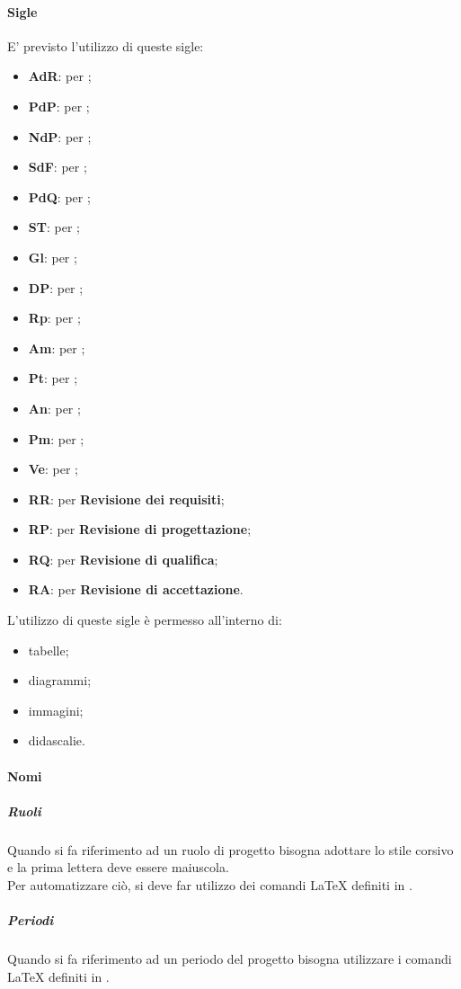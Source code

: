  \paragraph{Sigle}
E' previsto l'utilizzo di queste sigle:
\begin{itemize}
	\item \textbf{AdR}: per \ARdoc;
	\item \textbf{PdP}: per \PPdoc;
	\item \textbf{NdP}: per \NPdoc;
	\item \textbf{SdF}: per \SFdoc;
	\item \textbf{PdQ}: per \PQdoc;
	\item \textbf{ST}: per \STdoc;
	\item \textbf{Gl}: per \Gldoc;
	\item \textbf{DP}: per \DPdoc;
	\item \textbf{Rp}: per \RESP;
	\item \textbf{Am}: per \AMM;
	\item \textbf{Pt}: per \PJ;
	\item \textbf{An}: per \AN;
	\item \textbf{Pm}: per \PR;
	\item \textbf{Ve}: per \VER;
	\item \textbf{RR}: per \textbf{Revisione dei requisiti};
	\item \textbf{RP}: per \textbf{Revisione di progettazione};
	\item \textbf{RQ}: per \textbf{Revisione di qualifica};
	\item \textbf{RA}: per \textbf{Revisione di accettazione}.
\end{itemize}
L'utilizzo di queste sigle è permesso all'interno di:
\begin{itemize}
	\item tabelle;
	\item diagrammi;
	\item immagini;
	\item didascalie.
\end{itemize}
\paragraph{Nomi}
\subparagraph{Ruoli}
Quando si fa riferimento ad un ruolo di progetto bisogna adottare lo stile corsivo e la prima lettera deve essere maiuscola. \\
Per automatizzare ciò, si deve far utilizzo dei comandi \LaTeX{} definiti in \REF.
\subparagraph{Periodi}
Quando si fa riferimento ad un periodo del progetto bisogna utilizzare i comandi \LaTeX{} definiti in \REF.
